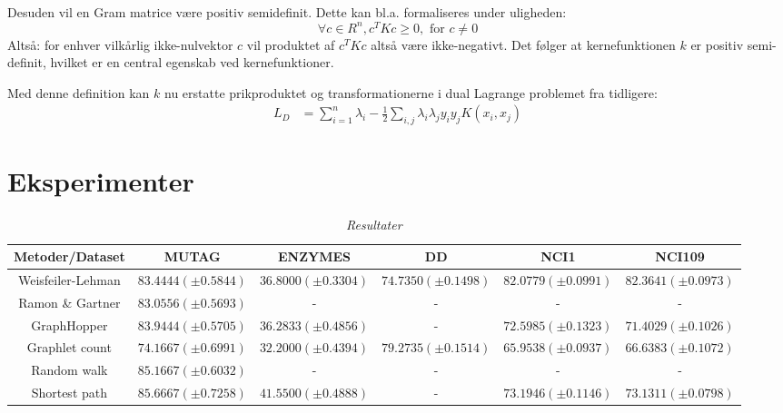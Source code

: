 \documentclass{article}
\begin{document}
Desuden vil en Gram matrice være positiv semidefinit. Dette kan bl.a. formaliseres under uligheden:
\begin{equation}
\forall c\in R^n,c^TKc\geq 0,\text{ for }c\neq 0
\end{equation}
Altså: for enhver vilkårlig ikke-nulvektor $c$ vil produktet af $c^TKc$ altså være ikke-negativt. Det følger at kernefunktionen $k$ er positiv semi-definit, hvilket er en central egenskab ved kernefunktioner.



Med denne definition kan $k$ nu erstatte prikproduktet og transformationerne i dual Lagrange problemet fra tidligere:
\begin{align*}
L_D&=\sum_{i=1}^{n}\lambda_i-\frac{1}{2}\sum_{i,j}\lambda_i\lambda_j y_iy_jK(x_i,x_j)
\end{align*}

\section{Eksperimenter}
\begin{table}[H]
\begin{center}
\scalebox{0.7} {
\begin{tabular}{c|c|c|c|c|c}
Metoder/Dataset & MUTAG & ENZYMES & DD & NCI1 & NCI109 \\
\hline
Weisfeiler-Lehman & $83.4444 (\pm 0.5844)$ & $36.8000 (\pm 0.3304)$ & $74.7350 (\pm 0.1498)$ & $82.0779 (\pm 0.0991)$ &  $82.3641 (\pm 0.0973)$ \\
Ramon \& Gartner & $83.0556 (\pm 0.5693)$ & - & -& - & - \\
GraphHopper & $83.9444 (\pm 0.5705)$ & $36.2833 (\pm 0.4856)$ & - & $72.5985 (\pm 0.1323)$ & $71.4029 (\pm 0.1026)$ \\
Graphlet count & $74.1667 (\pm 0.6991)$ & $32.2000 (\pm 0.4394)$ & $79.2735 (\pm 0.1514)$ & $65.9538 (\pm 0.0937)$ & $66.6383 (\pm 0.1072)$ \\
Random walk & $85.1667 (\pm 0.6032)$ & - & - & - & - \\
Shortest path & $85.6667 (\pm 0.7258)$ & $41.5500 (\pm 0.4888)$ & - & $73.1946 (\pm 0.1146)$ & $73.1311 (\pm 0.0798)$ \\
\end{tabular}
}
\caption{\textit{Resultater}}
\end{center}
\end{table}
\end{document}
